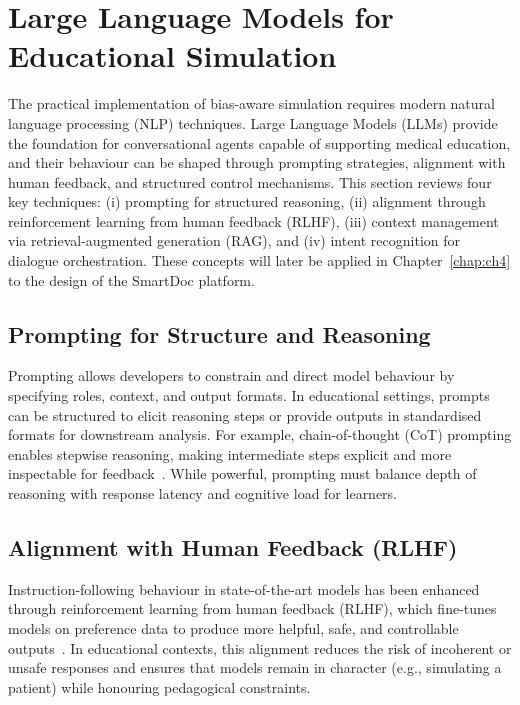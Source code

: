 \section{Large Language Models for Educational Simulation}
\label{sec:llm_edu}

The practical implementation of bias-aware simulation requires modern natural
language processing (NLP) techniques. Large Language Models (LLMs) provide the
foundation for conversational agents capable of supporting medical education,
and their behaviour can be shaped through prompting strategies, alignment with
human feedback, and structured control mechanisms. This section reviews four
key techniques: (i) prompting for structured reasoning, (ii) alignment through
reinforcement learning from human feedback (RLHF), (iii) context management via
retrieval-augmented generation (RAG), and (iv) intent recognition for dialogue
orchestration. These concepts will later be applied in Chapter~\ref{chap:ch4}
to the design of the SmartDoc platform.

\subsection{Prompting for Structure and Reasoning}
Prompting allows developers to constrain and direct model behaviour by specifying
roles, context, and output formats. In educational settings, prompts can be
structured to elicit reasoning steps or provide outputs in standardised formats
for downstream analysis. For example, chain-of-thought (CoT) prompting enables
stepwise reasoning, making intermediate steps explicit and more inspectable
for feedback~\parencite{wei_chain_2022}. While powerful, prompting must balance
depth of reasoning with response latency and cognitive load for learners.

\subsection{Alignment with Human Feedback (RLHF)}
Instruction-following behaviour in state-of-the-art models has been enhanced
through reinforcement learning from human feedback (RLHF), which fine-tunes
models on preference data to produce more helpful, safe, and controllable
outputs~\parencite{ouyang_instructgpt_2022}. In educational contexts, this
alignment reduces the risk of incoherent or unsafe responses and ensures that
models remain in character (e.g., simulating a patient) while honouring
pedagogical constraints.

